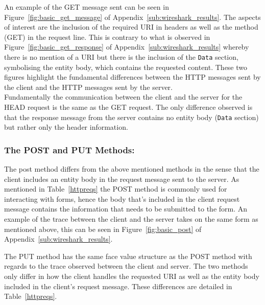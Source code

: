 \documentclass[10pt,twocolumn]{witseiepaper}
\begin{document}
		An example of the GET message sent can be seen in Figure~\ref{fig:basic_get_message} of Appendix~\ref{sub:wireshark_results}. The aspects of interest are the inclusion of the required URI in headers as well as the method (GET) in the request line. This is contrary to what is observed in Figure~\ref{fig:basic_get_response} of Appendix~\ref{sub:wireshark_results} whereby there is no mention of a URI but there is the inclusion of the \texttt{Data} section, symbolising the entity body, which contains the requested content. These two figures highlight the fundamental differences between the HTTP messages sent by the client and the HTTP messages sent by the server. \\
		
		Fundamentally the communication between the client and the server for the HEAD request is the same as the GET request. The only difference observed is that the response message from the server contains no entity body (\texttt{Data} section) but rather only the header information. 
		
		
		\subsubsection*{The POST and PUT Methods:} The post method differs from the above mentioned methods in the sense that the client includes an entity body in the request message sent to the server. As mentioned in Table~\ref{httpreqs} the POST method is commonly used for interacting with forms, hence the body that's included in the client request message contains the information that needs to be submitted to the form. An example of the trace between the client and the server takes on the same form as mentioned above, this can be seen in Figure~\ref{fig:basic_post} of Appendix~\ref{sub:wireshark_results}.
		
		 The PUT method has the same face value structure as the POST method with regards to the trace observed between the client and server. The two methods only differ in how the client handles the requested URI as well as the entity body included in the client's request message. These differences are detailed in Table~\ref{httpreqs}.
		 
\end{document}
